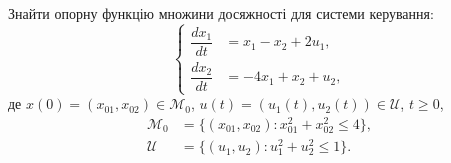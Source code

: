 \setcounter{section}{2}

\setcounter{problem}{7}

\begin{problem}
Знайти опорну функцію множини досяжності для системи керування:
\begin{equation*}
    \left\{
    \begin{aligned}
    \dfrac{dx_1}{dt} &= x_1 - x_2 + 2u_1, \\
    \dfrac{dx_2}{dt} &= -4x_1 + x_2 + u_2,
    \end{aligned}
    \right.
\end{equation*}
де $x(0) = (x_{01}, x_{02}) \in \mathcal{M}_0$, $u(t) = (u_1(t), u_2(t)) \in\mathcal{U}$, $t\ge0$,
\begin{align*}
    \mathcal{M}_0 &= \{(x_{01},x_{02}): x_{01}^2 + x_{02}^2 \le 4\}, \\
    \mathcal{U} &= \{(u_1, u_2): u_1^2 + u_2^2 \le 1\}.
\end{align*}
\end{problem}

